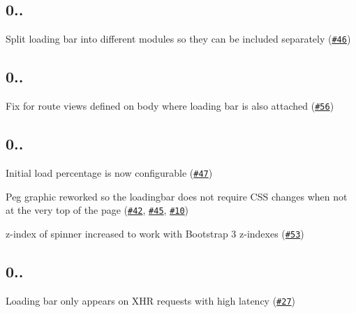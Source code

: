 \subsection*{0..}


\begin{DoxyItemize}
\item Split loading bar into different modules so they can be included separately (\href{https://github.com/chieffancypants/angular-loading-bar/issues/46}{\tt \#46})
\end{DoxyItemize}

\subsection*{0..}


\begin{DoxyItemize}
\item Fix for route views defined on body where loading bar is also attached (\href{https://github.com/chieffancypants/angular-loading-bar/issues/56}{\tt \#56})
\end{DoxyItemize}

\subsection*{0..}


\begin{DoxyItemize}
\item Initial load percentage is now configurable (\href{https://github.com/chieffancypants/angular-loading-bar/issues/47}{\tt \#47})
\item Peg graphic reworked so the loadingbar does not require C\+SS changes when not at the very top of the page (\href{https://github.com/chieffancypants/angular-loading-bar/issues/42}{\tt \#42}, \href{https://github.com/chieffancypants/angular-loading-bar/issues/45}{\tt \#45}, \href{https://github.com/chieffancypants/angular-loading-bar/issues/10}{\tt \#10})
\item z-\/index of spinner increased to work with Bootstrap 3 z-\/indexes (\href{https://github.com/chieffancypants/angular-loading-bar/issues/53}{\tt \#53})
\end{DoxyItemize}

\subsection*{0..}


\begin{DoxyItemize}
\item Loading bar only appears on X\+HR requests with high latency (\href{https://github.com/chieffancypants/angular-loading-bar/issues/27}{\tt \#27})
\end{DoxyItemize}

